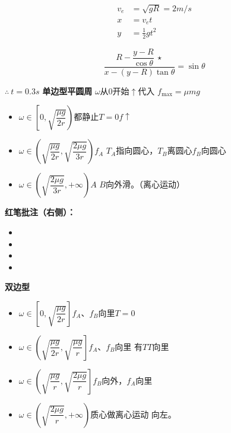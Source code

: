 \begin{align*}
v_e&=\sqrt{gR}=2\unit{m/s}\\
x&=v_e t\\
y&=\tfrac{1}{2}gt^2
\end{align*}

\[
\frac{R-\dfrac{y-R}{\cos\theta}\ \star}{x-(y-R)\tan\theta}=\sin\theta
\]

$\therefore\ t=0.3\unit{s}$
\textbf{单边型平圆周}
$\omega$从0开始$\uparrow$\quad 代入 $f_{\max}=\mu mg$
\begin{itemize}
\item $\omega\in\left[0,\sqrt{\dfrac{\mu g}{2r}}\right)$\quad 都静止\quad $T=0$\quad $f\uparrow$
\item $\omega\in\left(\sqrt{\dfrac{\mu g}{2r}},\sqrt{\dfrac{2\mu g}{3r}}\right)$\quad $f_A$ $T_A$指向圆心，$T_B$离圆心\quad $f_B$向圆心
\item $\omega\in\left(\sqrt{\dfrac{2\mu g}{3r}},+\infty\right)$\quad $A$ $B$向外滑。（离心运动）
\end{itemize}
\textbf{红笔批注（右侧）：}
\begin{itemize}
\item {}
\item {} %
\item {}
\item {}
\end{itemize}
\textbf{双边型}
\begin{itemize}
\item $\omega\in\left[0,\sqrt{\dfrac{\mu g}{2r}}\right]$\quad $f_A$、$f_B$向里\quad $T=0$
\item $\omega\in\left(\sqrt{\dfrac{\mu g}{2r}},\sqrt{\dfrac{\mu g}{r}}\right]$\quad $f_A$、$f_B$向里 有$T$\quad $T$向里
\item $\omega\in\left(\sqrt{\dfrac{\mu g}{r}},\sqrt{\dfrac{2\mu g}{r}}\right]$\quad $f_B$向外，$f_A$向里
\item $\omega\in\left(\sqrt{\dfrac{2\mu g}{r}},+\infty\right)$\quad 质心做离心运动 向左。
\end{itemize}

